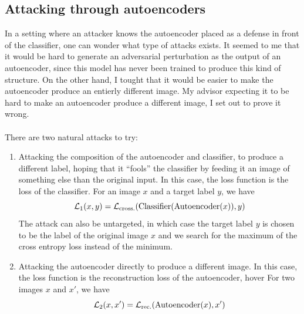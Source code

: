 \documentclass[]{scrarticle}
\begin{document}
\subsection{Attacking through autoencoders}

In a setting where an attacker knows the autoencoder placed as a defense
in front of the classifier, one can wonder what type of attacks exists.
It seemed to me that it would be hard to generate an adversarial perturbation
as the output of an autoencoder, since this model has never been trained
to produce this kind of structure. On the other hand, I tought that it would
be easier to make the autoencoder produce an entierly different image.
My advisor expecting it to be hard to make an autoencoder produce a different
image, I set out to prove it wrong.

\paragraph{}
There are two natural attacks to try:
\begin{enumerate}
  \item Attacking the composition of the autoencoder and classifier, to
    produce a different label, hoping that it ``fools'' the classifier
    by feeding it an image of something else than the original input.
    In this case, the loss function is the loss of the classifier.
    For an image $x$ and a target label $y$, we have
    \[
      \mathcal L_1(x, y) = \mathcal L_{\text{cross.}}(\mathrm{Classifier}(\mathrm{Autoencoder}(x)), y)
    \]
    The attack can also be untargeted, in which case the target label $y$
    is chosen to be the label of the original image $x$ and we search
    for the maximum of the cross entropy loss instead of the minimum.
  \item Attacking the autoencoder directly to produce a different image.
    In this case, the loss function is the reconstruction loss of the autoencoder,
    hover
    For two images $x$ and $x'$, we have
    \[
      \mathcal L_2(x, x') = \mathcal L_{\text{rec.}}(\mathrm{Autoencoder}(x), x')
    \]
\end{enumerate}
\end{document}
